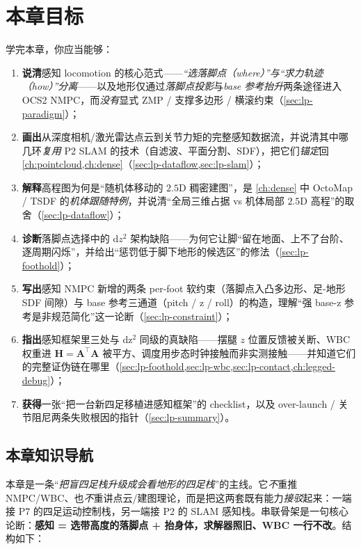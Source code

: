 \section*{本章目标}
学完本章，你应当能够：
\begin{enumerate}
  \item \textbf{说清}感知 locomotion 的核心范式——\emph{“选落脚点（where）”与“求力轨迹（how）”分离}——以及地形仅通过\emph{落脚点投影}与\emph{base 参考抬升}两条途径进入 OCS2 NMPC，而\emph{没有}显式 ZMP / 支撑多边形 / 横滚约束（\cref{sec:lp-paradigm}）；
  \item \textbf{画出}从深度相机/激光雷达点云到关节力矩的完整感知数据流，并说清其中哪几环\emph{复用} P2 SLAM 的技术（自滤波、平面分割、SDF），把它们\emph{锚定}回 \cref{ch:pointcloud,ch:dense}（\cref{sec:lp-dataflow,sec:lp-slam}）；
  \item \textbf{解释}高程图为何是“随机体移动的 $2.5$D 稠密建图”，是 \cref{ch:dense} 中 OctoMap / TSDF 的\emph{机体跟随特例}，并说清“全局三维占据 vs 机体局部 $2.5$D 高程”的取舍（\cref{sec:lp-dataflow}）；
  \item \textbf{诊断}落脚点选择中的 $\mathrm{d}z^2$ 架构缺陷——为何它让脚“留在地面、上不了台阶、逐周期闪烁”，并给出“惩罚低于脚下地形的候选区”的修法（\cref{sec:lp-foothold}）；
  \item \textbf{写出}感知 NMPC 新增的两条 per-foot 软约束（落脚点入凸多边形、足-地形 SDF 间隙）与 base 参考三通道（pitch / z / roll）的构造，理解“强 base-z 参考是非规范简化”这一论断（\cref{sec:lp-constraint}）；
  \item \textbf{指出}感知框架里三处与 dz$^2$ 同级的真缺陷——摆腿 $z$ 位置反馈被关断、WBC 权重进 $\mathbf{H}=\mathbf{A}^\top\mathbf{A}$ 被平方、调度用步态时钟接触而非实测接触——并知道它们的完整证伪链在哪里（\cref{sec:lp-foothold,sec:lp-wbc,sec:lp-contact,ch:legged-debug}）；
  \item \textbf{获得}一张“把一台新四足移植进感知框架”的 checklist，以及 over-launch / 关节阻尼两条失败根因的指针（\cref{sec:lp-summary}）。
\end{enumerate}

\subsection*{本章知识导航}
本章是一条“\emph{把盲四足栈升级成会看地形的四足栈}”的主线。它\emph{不}重推 NMPC/WBC、也\emph{不}重讲点云/建图理论，而是把这两套既有能力\emph{接驳}起来：一端接 P7 的四足运动控制栈，另一端接 P2 的 SLAM 感知栈。串联骨架是一句核心论断：\textbf{感知 = 选带高度的落脚点 + 抬身体，求解器照旧、WBC 一行不改}。结构如下：

